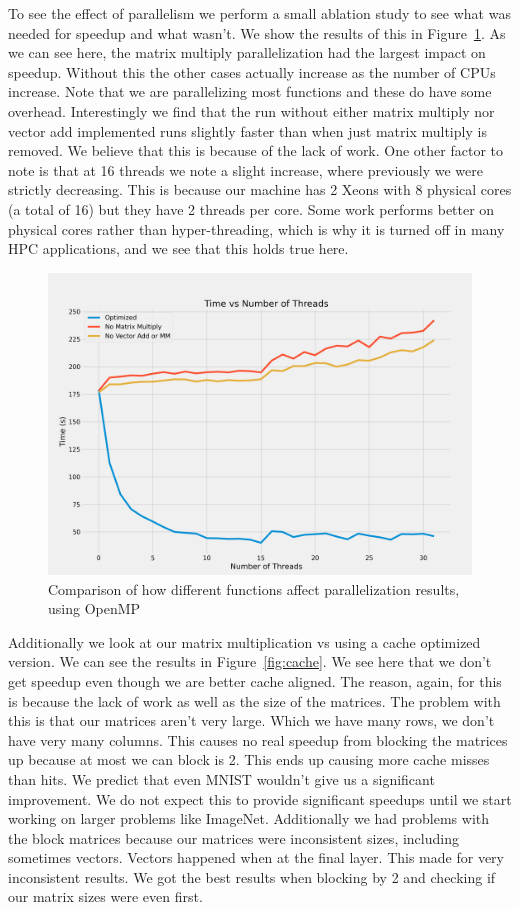 To see the effect of parallelism we perform a small ablation study to see what
was needed for speedup and what wasn't. We show the results of this in
Figure~\ref{fig:omp}. As we can see here, the matrix multiply parallelization
had the largest impact on speedup. Without this the other cases actually
increase as the number of CPUs increase. Note that we are parallelizing most
functions and these do have some overhead. Interestingly we find that the run
without either matrix multiply nor vector add implemented runs slightly faster
than when just matrix multiply is removed. We believe that this is because of
the lack of work. One other factor to note is that at 16 threads we note a
slight increase, where previously we were strictly decreasing. This is because
our machine has 2 Xeons with 8 physical cores (a total of 16) but they have 2
threads per core. Some work performs better on physical cores rather than
hyper-threading, which is why it is turned off in many HPC applications, and we
see that this holds true here. 

\begin{figure}[ht]
\centering
\includegraphics[width=\linewidth]{omp.png}
\caption{Comparison of how different functions affect parallelization results,
    using OpenMP}
    \label{fig:omp}
\end{figure}

Additionally we look at our matrix multiplication vs using a cache optimized
version. We can see the results in Figure~\ref{fig:cache}. We see here that we
don't get speedup even though we are better cache aligned. The reason, again,
for this is because the lack of work as well as the size of the matrices. The
problem with this is that our matrices aren't very large. Which we have many
rows, we don't have very many columns. This causes no real speedup from blocking
the matrices up because at most we can block is 2. This ends up causing more
cache misses than hits. We predict that even MNIST wouldn't give us a
significant improvement. We do not expect this to provide significant speedups
until we start working on larger problems like ImageNet. Additionally we had
problems with the block matrices because our matrices were inconsistent sizes,
including sometimes vectors. Vectors happened when at the final layer. This made
for very inconsistent results. We got the best results when blocking by 2 and
checking if our matrix sizes were even first. 

